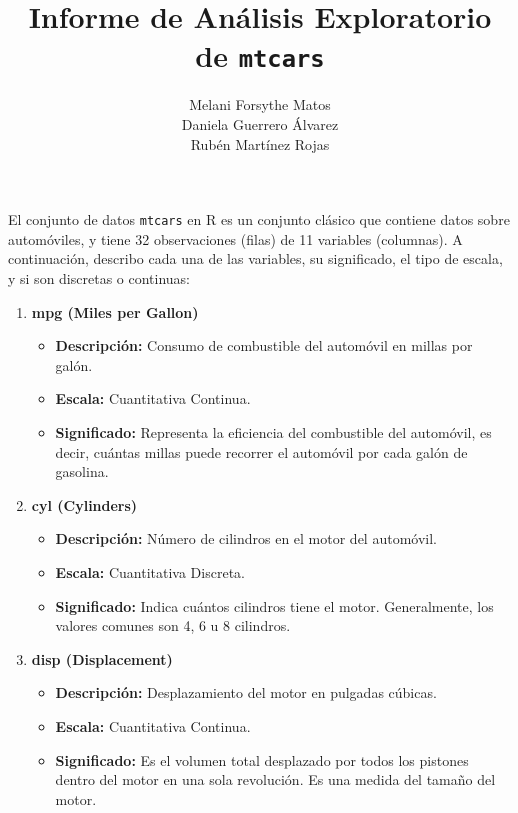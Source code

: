 \documentclass{article}
\title{Informe de Análisis Exploratorio de \texttt{mtcars}}
\author{
      Melani Forsythe Matos \\
      Daniela Guerrero Álvarez \\
      Rubén Martínez Rojas
    }
\date{} %
\begin{document}
\maketitle

\newpage %

El conjunto de datos \texttt{mtcars} en R es un conjunto clásico que contiene datos sobre automóviles, y tiene 32 observaciones (filas) de 11 variables (columnas). A continuación, describo cada una de las variables, su significado, el tipo de escala, y si son discretas o continuas:

\begin{enumerate}
    \item \textbf{mpg (Miles per Gallon)}

          \begin{itemize}
              \item \textbf{Descripción:} Consumo de combustible del automóvil en millas por galón.
              \item \textbf{Escala:} Cuantitativa Continua.
              \item \textbf{Significado:} Representa la eficiencia del combustible del automóvil, es decir, cuántas millas puede recorrer el automóvil por cada galón de gasolina.
          \end{itemize}

    \item \textbf{cyl (Cylinders)}

          \begin{itemize}
              \item \textbf{Descripción:} Número de cilindros en el motor del automóvil.
              \item \textbf{Escala:} Cuantitativa Discreta.
              \item \textbf{Significado:} Indica cuántos cilindros tiene el motor. Generalmente, los valores comunes son 4, 6 u 8 cilindros.
          \end{itemize}

    \item \textbf{disp (Displacement)}

          \begin{itemize}
              \item \textbf{Descripción:} Desplazamiento del motor en pulgadas cúbicas.
              \item \textbf{Escala:} Cuantitativa Continua.
              \item \textbf{Significado:} Es el volumen total desplazado por todos los pistones dentro del motor en una sola revolución. Es una medida del tamaño del motor.
          \end{itemize}


\end{enumerate}
\end{document}
